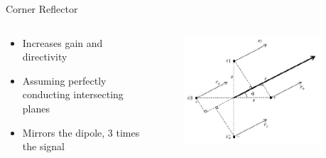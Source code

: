 \documentclass{beamer}
\begin{document}
\begin{frame}{Corner Reflector}
\begin{columns}[T]
    \begin{column}{.5\textwidth}
\begin{itemize} 
\item	Increases gain and directivity
\item   Assuming perfectly conducting intersecting planes
\item	Mirrors the dipole, 3 times the signal
\end{itemize}
    \end{column}
    \begin{column}{.5\textwidth}    
\begin{figure}
\includegraphics[width=0.9\textwidth]{reflector_image_theory.PNG}
\cite{1_vetharatnam_rashidifar_2015}
\end{figure}    
    \end{column}
  \end{columns}
\end{frame}


\end{document}
